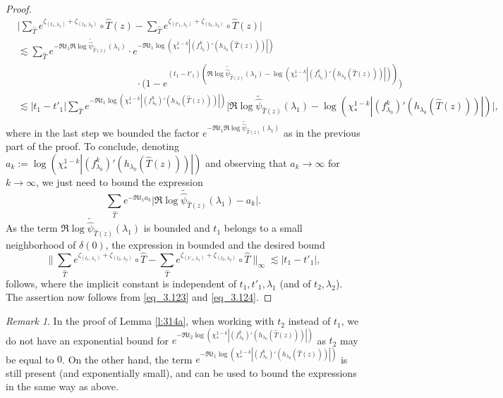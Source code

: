 \documentclass[11pt]{amsart}
\theoremstyle{plain}
\theoremstyle{definition}
\theoremstyle{remark}
\newtheorem{rmk}[thm]{Remark}
\begin{document}
\begin{proof}
\begin{align*}
& \Big|
\sum_{\hat T} e^{\zeta_{(t_1,\lambda_1)}
+
\zeta_{(t_2, \lambda_2)}} \circ \hat{T} (z)  - \sum_{\hat T} e^{\zeta_{(t'_1,\lambda_1)}
+
\zeta_{(t_2, \lambda_2)}}\circ \hat{T} (z)\Big| 
\\
& \lesssim
\sum_{\hat T} 
 e^{-\Re t_1  \Re \widetilde{\log \hat{\psi}_{\hat{T} 
(z)}}(\lambda_1)}
\cdot 
e^{- 
 \Re
t_1 \log(\chi_*^{1-k}|(f^k_{\lambda_0})' (h_{\lambda_0}(\hat{T} 
 (z)))|)} \\[-0.3cm]
& \quad \quad
 \quad \quad
  \quad \quad
   \quad \quad
    \quad \quad
     \quad \quad
     \cdot
\big(1- e^{
 (t_1 -t'_1)(\Re \widetilde{\log \hat{\psi}_{\hat{T} 
  (z)}}(\lambda_1)-  \log(\chi_*^{1-k}|(f^k_{\lambda_0})' (h_{\lambda_0}(\hat{T} 
  (z)))|))
}\big)\\[0.1cm]
& \lesssim
|t_1-t'_1|
\sum_{\hat T} 
e^{- \Re t_1 \log(\chi_*^{1-k}|(f^k_{\lambda_0})' (h_{\lambda_0}(\hat{T} 
 (z)))|)} 
\big|\Re \widetilde{\log \hat{\psi}_{\hat{T} 
 (z)}}(\lambda_1)-
\log(\chi_*^{1-k}|(f^k_{\lambda_0})' (h_{\lambda_0}(\hat{T} 
(z)))|)\big|,
\end{align*}
where in the last step we bounded the factor 
$e^{- \Re t_1 \Re \widetilde{\log \hat{\psi}_{\hat{T} 
(z)}}(\lambda_1)}$
as in the previous part of the proof. 
To conclude, denoting 
$a_k:=\log(\chi_*^{1-k}|(f^k_{\lambda_0})' (h_{\lambda_0}(\hat{T} 
 (z)))|)$
and observing that $a_k\to \infty$ for $k\to \infty$,
we just need to bound the expression
\[
\sum_{\hat T} 
e^{-\Re  t_1 a_k} 
\big|\Re \widetilde{\log \hat{\psi}_{\hat{T} 
 (z)}}(\lambda_1)-
a_k\big|. 
\]
As the  term
$\Re \widetilde{\log \hat{\psi}_{\hat{T} 
(z)}}(\lambda_1)$ is bounded and $t_1$ belongs to a small neighborhood of $\delta(0)$,
the expression in bounded and the desired bound 
\begin{equation}\label{eq_3.124}
\Big\|\sum_{\hat T} e^{\zeta_{(t_1,\lambda_1)}
+
\zeta_{(t_2,\lambda_2)}} \circ \hat{T} - \sum_{\hat T} e^{\zeta_{(t'_1,\lambda_1)}
+
\zeta_{(t_2,\lambda_2)}
} \circ \hat{T} \Big\|_\infty \lesssim |t_1-t'_1|,
\end{equation}
follows,
where
the implicit constant is independent of $t_1,t'_1,\lambda_1$
(and of $t_2,\lambda_2$).
The assertion now follows from \eqref{eq_3.123} and \eqref{eq_3.124}.
\end{proof}

\begin{rmk}\label{r:t1t2}
In the proof of Lemma \ref{l:314a}, when working with $t_2$ instead of $t_1$, we do not have an exponential bound for
$e^{- \Re t_2 \log(\chi_*^{1-k}|(f^k_{\lambda_0})' (h_{\lambda_0}(\hat{T} 
 (z)))|)}$
as $t_2$ may be equal to $0$.
On the other hand, the term 
$e^{- \Re t_1 \log(\chi_*^{1-k}|(f^k_{\lambda_0})' (h_{\lambda_0}(\hat{T} 
 (z)))|)}$
is still present (and exponentially small), and can be used to bound the expressions
in the same way as above.
\end{rmk}
\end{document}
